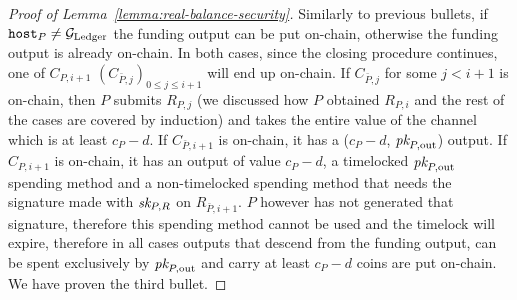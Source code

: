 \begin{proof}[Proof of Lemma~\ref{lemma:real-balance-security}]
  Similarly to previous bullets, if $\mathtt{host}_P \neq \mathcal{G}_{\mathrm{Ledger}}$ the funding
  output can be put on-chain, otherwise the funding output is already on-chain.
  In both cases, since the closing procedure continues, one of $C_{P, i+1}$
  $(C_{\bar{P}, j})_{0 \leq j \leq i+1}$ will end up on-chain. If $C_{\bar{P},
  j}$ for some $j < i+1$ is on-chain, then $P$ submits $R_{P, j}$ (we discussed
  how $P$ obtained $R_{P, i}$ and the rest of the cases are covered by
  induction) and takes the entire value of the channel which is at least $c_P -
  d$. If $C_{\bar{P}, i+1}$ is on-chain, it has a ($c_P - d$, $\textit{pk}_{P,
  \mathrm{out}}$) output. If $C_{P, i+1}$ is on-chain, it has an output of value
  $c_P - d$, a timelocked $\textit{pk}_{P, \mathrm{out}}$ spending method and a
  non-timelocked spending method that needs the signature made with $\textit{sk}_{P, R}$
  on $R_{\bar{P}, i+1}$. $P$ however has not generated that signature, therefore
  this spending method cannot be used and the timelock will expire, therefore in
  all cases outputs that descend from the funding output, can be spent
  exclusively by $\textit{pk}_{P, \mathrm{out}}$ and carry at least $c_P - d$ coins are
  put on-chain. We have proven the third bullet.


\end{proof}
